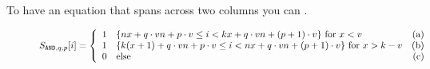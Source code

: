 \documentclass[]{IEEEtran}
\begin{document}
To have an equation that spans across two columns you can .
\begin{figure}[!tbh]
	\begin{align}
	S_{\texttt{AND},q,p}[i] &= \left\{ \begin{array}{llr} 
		\text{1} &\{ nx +q\cdot vn+p\cdot v \le i < kx+q\cdot vn+(p+1)\cdot v\} \text{ for } x<v &(\text{a})\\
		\text{1} &\{ k(x+1)+q\cdot vn+p\cdot v \le i < nx+q\cdot vn+(p+1)\cdot v\} \text{ for } x>k-v &(\text{b})\\
		\text{0} &\text{else} &(\text{c})
		\end{array} \right. 	\label{equ:S_{AND,q,p}}
		\end{align}
\end{figure}




%
%
%


% 

\end{document}
